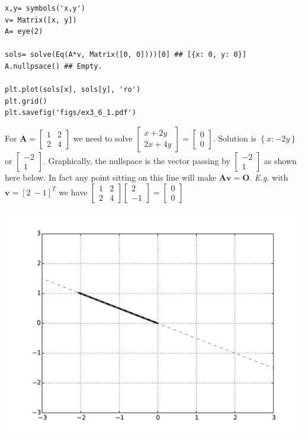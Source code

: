 \begin{verbatim}
x,y= symbols('x,y')
v= Matrix([x, y])
A= eye(2)

sols= solve(Eq(A*v, Matrix([0, 0])))[0] ## [{x: 0, y: 0}]
A.nullpsace() ## Empty. 

plt.plot(sols[x], sols[y], 'ro')
plt.grid()
plt.savefig('figs/ex3_6_1.pdf')
\end{verbatim}

For $\mathbf{A}= \left[\begin{matrix}1 & 2\\2 & 4\end{matrix}\right]$ we need to
solve $\left[\begin{matrix}x + 2 y\\2 x + 4 y\end{matrix}\right] = \left[\begin{matrix}0\\0\end{matrix}\right]$.
Solution is $\left \{ x : - 2 y\right \}$ or $\left[\begin{matrix}-2\\1\end{matrix}\right]$.
Graphically, the nullspace is the vector passing by $\left[\begin{matrix}-2\\1\end{matrix}\right]$
as shown here below. In fact any point sitting on this line will make $\mathbf{Av = O}$.
\emph{E.g.} with $\mathbf{v} = [2\ -1]^T$ we have $\left[\begin{matrix}1 & 2\\2 & 4\end{matrix}\right] \left[\begin{matrix}2\\-1\end{matrix}\right] =
\left[\begin{matrix}0\\0\end{matrix}\right]$

\includegraphics[width=0.7\linewidth]{figs/ex3_6_1b.pdf}

